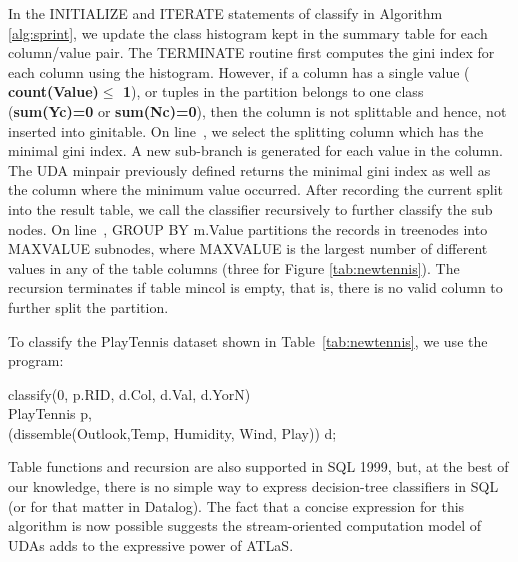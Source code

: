 {In the {\cw INITIALIZE} and {\cw ITERATE} statements of {\bw classify}
in Algorithm \ref{alg:sprint}, we update the class histogram kept in
the {\bw summary} table for each column/value pair.  The {\cw
  TERMINATE} routine first computes the gini index for each column
using the histogram.  However, if a column has a single value ({\small
  \bf count(Value)$\le$ 1}), or tuples in the partition belongs to one
class ({\small \bf{sum(Yc)=0}} or {\small \bf{sum(Nc)=0}}), then the
column is not splittable and hence, not inserted into {\bw ginitable}.
On line~, we select the splitting column which
has the minimal gini index. A new sub-branch is generated for each
value in the column.  The UDA {\bw minpair} previously defined
 returns the minimal gini index as well
as the column where the minimum value occurred. After recording the
current split into the {\bw result} table, we call the classifier
recursively to further classify the sub nodes.  On
line~, {\cw GROUP BY} {\bw m.Value} partitions the
records in {\bw treenodes} into {\bw MAXVALUE} subnodes, where {\bw
  MAXVALUE} is the largest number of different values in any of the
table columns (three for Figure \ref{tab:newtennis}).
The recursion terminates if table {\bw mincol} is empty, that is,
there is no valid column to further split the partition.

To classify the PlayTennis dataset shown in Table~\ref{tab:newtennis}, we
use the program:
\begin{codedisplay}
\>\> classify(0, p.RID, d.Col, d.Val, d.YorN)\\
\>\> PlayTennis  p, \\
\>\>\>\>(dissemble(Outlook,Temp, Humidity, Wind, Play))  d;\\
\end{codedisplay}

Table functions and recursion are also supported in SQL 1999, but, at
the best of our knowledge, there is no simple way to express
decision-tree classifiers in SQL (or for that matter in Datalog).
The fact that a concise expression for this algorithm is now
possible suggests the stream-oriented
computation model of UDAs adds to the expressive power of ATLaS.

}
